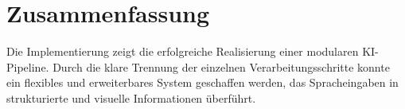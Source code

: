 \section{Zusammenfassung}
Die Implementierung zeigt die erfolgreiche Realisierung einer modularen KI-Pipeline. Durch die klare Trennung der einzelnen Verarbeitungsschritte konnte ein flexibles und erweiterbares System geschaffen werden, das Spracheingaben in strukturierte und visuelle Informationen überführt.